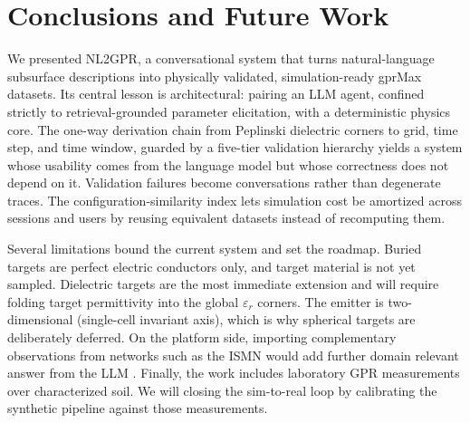 \documentclass[journal]{IEEEtran}
\begin{document}
\section{Conclusions and Future Work}
\label{sec:conclusion}

We presented NL2GPR, a conversational system that turns natural-language subsurface descriptions into physically validated, simulation-ready gprMax datasets. Its central lesson is architectural: pairing an LLM agent, confined strictly to retrieval-grounded parameter elicitation, with a deterministic physics core. The one-way derivation chain from Peplinski dielectric corners to grid, time step, and time window, guarded by a five-tier validation hierarchy yields a system whose usability comes from the language model but whose correctness does not depend on it. Validation failures become conversations rather than degenerate traces. The configuration-similarity index lets simulation cost be amortized across sessions and users by reusing equivalent datasets instead of recomputing them.

Several limitations bound the current system and set the roadmap. Buried targets are perfect electric conductors only, and target material is not yet sampled. Dielectric targets are the most immediate extension and will require folding target permittivity into the global $\varepsilon_r$ corners. The emitter is two-dimensional (single-cell invariant axis), which is why spherical targets are deliberately deferred. On the platform side, importing complementary observations from networks such as the ISMN would add further domain relevant answer from the LLM \cite{dorigo2011ismn}. Finally, the work includes laboratory GPR measurements over characterized soil. We will closing the sim-to-real loop by calibrating the synthetic pipeline against those measurements.





 
\end{document}
